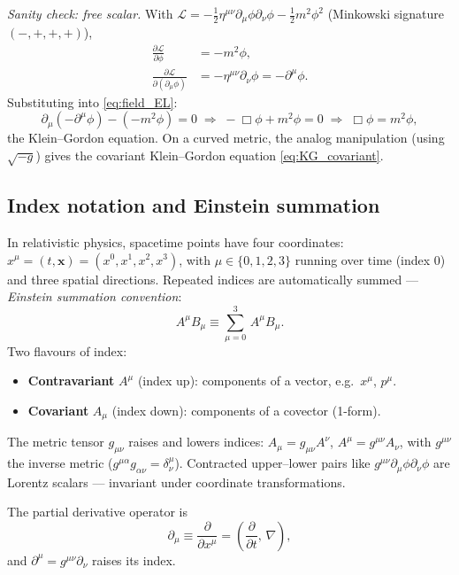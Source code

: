 \documentclass[12pt]{article}
\begin{document}
\emph{Sanity check: free scalar.}  With
$\mathcal L = -\tfrac{1}{2}\eta^{\mu\nu}\partial_\mu\phi\partial_\nu\phi
- \tfrac{1}{2}m^2\phi^2$ (Minkowski signature $(-,+,+,+)$),
%
\begin{align}
  \frac{\partial\mathcal L}{\partial\phi} &= -m^2\phi, \\
  \frac{\partial\mathcal L}{\partial(\partial_\mu\phi)}
    &= -\eta^{\mu\nu}\partial_\nu\phi
    = -\partial^\mu\phi.
\end{align}
%
Substituting into \eqref{eq:field_EL}:
%
\begin{equation}
  \partial_\mu(-\partial^\mu\phi) - (-m^2\phi) = 0
  \;\Longrightarrow\;
  -\Box\phi + m^2\phi = 0
  \;\Longrightarrow\;
  \Box\phi = m^2\phi,
\end{equation}
%
the Klein--Gordon equation.  On a curved metric, the analog
manipulation (using $\sqrt{-g}$) gives the covariant Klein--Gordon
equation \eqref{eq:KG_covariant}.

\subsection{Index notation and Einstein summation}
\label{app:index}

In relativistic physics, spacetime points have four coordinates:
$x^\mu = (t, \mathbf x) = (x^0, x^1, x^2, x^3)$, with $\mu\in\{0,1,2,3\}$
running over time (index 0) and three spatial directions.  Repeated
indices are automatically summed --- \emph{Einstein summation
convention}:
%
\begin{equation}
  A^\mu B_\mu \equiv \sum_{\mu=0}^{3}\,A^\mu B_\mu.
\end{equation}
%
Two flavours of index:
%
\begin{itemize}
  \item \textbf{Contravariant} $A^\mu$ (index up): components of a
        vector, e.g.\ $x^\mu$, $p^\mu$.
  \item \textbf{Covariant} $A_\mu$ (index down): components of a
        covector (1-form).
\end{itemize}
%
The metric tensor $g_{\mu\nu}$ raises and lowers indices:
$A_\mu = g_{\mu\nu} A^\nu$, $A^\mu = g^{\mu\nu} A_\nu$, with
$g^{\mu\nu}$ the inverse metric ($g^{\mu\alpha}g_{\alpha\nu} =
\delta^\mu_\nu$).  Contracted upper--lower pairs like
$g^{\mu\nu}\partial_\mu\phi\partial_\nu\phi$ are Lorentz scalars ---
invariant under coordinate transformations.

The partial derivative operator is
%
\begin{equation}
  \partial_\mu \equiv \frac{\partial}{\partial x^\mu}
    = \left(\frac{\partial}{\partial t},\,\nabla\right),
\end{equation}
%
and $\partial^\mu = g^{\mu\nu}\partial_\nu$ raises its index.
\end{document}
